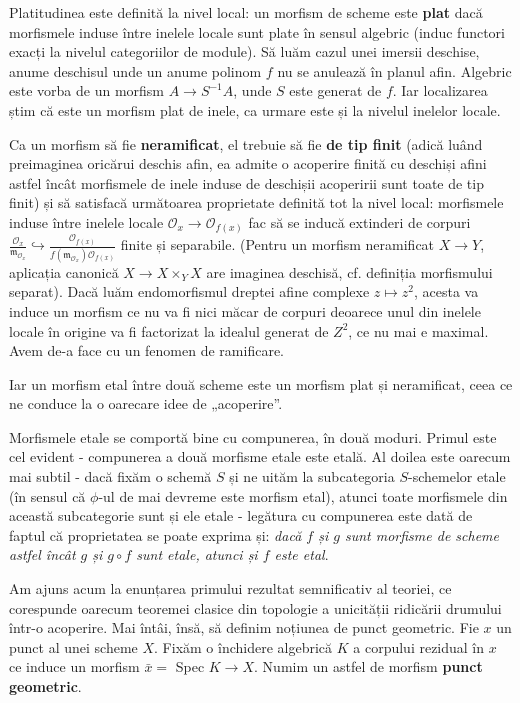\documentclass[13pt,openany,oneside]{book}
\begin{document}
Platitudinea este definită la nivel local: un morfism de scheme este {\bf plat } dacă morfismele induse între inelele locale sunt plate în sensul algebric (induc functori exacți la nivelul categoriilor de module). Să luăm cazul unei imersii deschise, anume deschisul unde un anume polinom $f$ nu se anulează în planul afin. Algebric este vorba de un morfism $A \to S^{-1}A$, unde $S$ este generat de $f$. Iar localizarea știm că este un morfism plat de inele, ca urmare este și la nivelul inelelor locale.

Ca un morfism să fie {\bf neramificat}, el trebuie să fie {\bf de tip finit} (adică luând preimaginea oricărui deschis afin, ea admite o acoperire finită cu deschiși afini astfel încât morfismele de inele induse de deschișii acoperirii sunt toate de tip finit) și să satisfacă următoarea proprietate definită tot la nivel local: morfismele induse între inelele locale $\mathcal{O}_x \rightarrow \mathcal{O}_{f(x)}$ fac să se inducă extinderi de corpuri $\frac{\mathcal{O}_x}{\mathfrak{m}_{\mathcal{O}_x}} \hookrightarrow \frac{\mathcal{O}_{f(x)}}{f(\mathfrak{m}_{\mathcal{O}_x})\mathcal{O}_{f(x)}}$ finite și separabile. (Pentru un morfism neramificat $X \rightarrow Y$, aplicația canonică $X \rightarrow X\times_Y X$ are imaginea deschisă, cf. definiția morfismului separat). Dacă luăm endomorfismul dreptei afine complexe $z \mapsto z^2$, acesta va induce un morfism ce nu va fi nici măcar de corpuri deoarece unul din inelele locale în origine va fi factorizat la idealul generat de $Z^2$, ce nu mai e maximal. Avem de-a face cu un fenomen de ramificare.

Iar un morfism etal între două scheme este un morfism plat și neramificat, ceea ce ne conduce la o oarecare idee de „acoperire”.

Morfismele etale se comportă bine cu compunerea, în două moduri. Primul este cel evident - compunerea a două morfisme etale este etală. Al doilea este oarecum mai subtil - dacă fixăm o schemă $S$ și ne uităm la subcategoria $S$-schemelor etale (în sensul că $\phi$-ul de mai devreme este morfism etal), atunci toate morfismele din această subcategorie sunt și ele etale - legătura cu compunerea este dată de faptul că proprietatea se poate exprima și: {\it dacă $f$ și $g$ sunt morfisme de scheme astfel încât $g$ și $g \circ f$ sunt etale, atunci și $f$ este etal}.

Am ajuns acum la enunțarea primului rezultat semnificativ al teoriei, ce corespunde oarecum teoremei clasice din topologie a unicității ridicării drumului într-o acoperire. Mai întâi, însă, să definim noțiunea de punct geometric. Fie $x$ un punct al unei scheme $X$. Fixăm o închidere algebrică $K$ a corpului rezidual în $x$ ce induce un morfism $\bar{x}=$ Spec $K\rightarrow X$. Numim un astfel de morfism {\bf punct geometric}.
\end{document}
